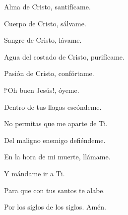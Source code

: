 Alma de Cristo, santifícame.

Cuerpo de Cristo, sálvame.

Sangre de Cristo, lávame.

Agua del costado de Cristo, purifícame.

Pasión de Cristo, confórtame.

{!`}Oh buen Jesús!, óyeme.

Dentro de tus llagas escóndeme.

No permitas que me aparte de Ti.

Del maligno enemigo defiéndeme.

En la hora de mi muerte, llámame.

Y mándame ir a Ti.

Para que con tus santos te alabe.

Por los siglos de los siglos. Amén.